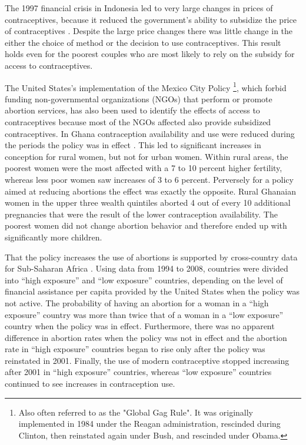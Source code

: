 \documentclass[letterpaper,12pt]{article}
\begin{document}
The 1997 financial crisis in Indonesia led to very large changes
in prices of contraceptives, because it reduced the government's
ability to subsidize the price of contraceptives \citep{McKelvey2012}.
Despite the large price changes there was little change in the 
either the choice of method or the decision to use contraceptives.
This result holds even for the poorest couples who are most likely
to rely on the subsidy for access to contraceptives.

The United States's implementation of the Mexico City Policy%
\footnote{
Also often referred to as the "Global Gag Rule".
It was originally implemented in 1984 under the Reagan administration,
rescinded during Clinton, then reinstated again under Bush, and
rescinded under Obama.
},
which forbid funding non-governmental organizations (NGOs) that perform or 
promote abortion services, has also been used to identify the
effects of access to contraceptives because most of the NGOs
affected also provide subsidized contraceptives.
In Ghana contraception availability and use were reduced during the 
periods the policy was in effect \citep{Jones2015}.
This led to significant increases in conception for rural women,
but not for urban women.
Within rural areas, the poorest women were the most affected with
a 7 to 10 percent higher fertility, whereas less poor women saw
increases of 3 to 6 percent.
Perversely for a policy aimed at reducing abortions the effect
was exactly the opposite.
Rural Ghanaian women in the upper three wealth quintiles aborted 
4 out of every 10 additional pregnancies that were the result of 
the lower contraception availability.
The poorest women did not change abortion behavior and therefore
ended up with significantly more children.

That the policy increases the use of abortions is supported by
cross-country data for Sub-Saharan Africa \citep{Bendavid2011}.
Using data from 1994 to 2008, countries were divided into 
``high exposure'' and ``low exposure'' countries,
depending on the level of financial assistance per capita
provided by the United States when the policy was not active.
The probability of having an abortion for a woman in a ``high exposure''
country was more than twice that of a woman in a ``low exposure''
country when the policy was in effect. 
Furthermore, there was no apparent difference in abortion rates
when the policy was not in effect and the abortion rate in
``high exposure'' countries began to rise only after the
policy was reinstated in 2001.
Finally, the use of modern contraceptive stopped increasing
after 2001 in ``high exposure'' countries, whereas ``low
exposure'' countries continued to see increases in
contraception use.
\end{document}
